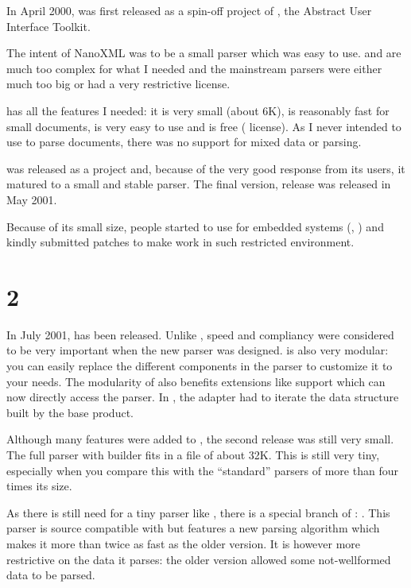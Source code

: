 In April 2000, \NanoXML{} was first released as a spin-off project of
, the Abstract User Interface Toolkit.

The intent of NanoXML was to be a small parser which was easy to use.
 and  are much too complex for what I needed and the
mainstream parsers were either much too big or had a very restrictive license.

 has all the features I needed: it is very small (about 6K),
is reasonably fast for small \XML{} documents, is very easy to use and is
free ( license).
As I never intended to use \NanoXML{} to parse  documents,
there was no support for mixed data or  parsing.

\NanoXML{} was released as a  project and, because of the
very good response from its users, it matured to a small and stable parser.
The final version, release  was released in May 2001.

Because of its small size, people started to use \NanoXML{} for embedded
systems (, ) and kindly submitted patches to make
\NanoXML{} work in such restricted environment.

\section{\NanoXML{} 2}

In July 2001,  has been released.
Unlike , speed and \XML{} compliancy were considered to be
very important when the new parser was designed.
 is also very modular: you can easily replace the different
components in the parser to customize it to your needs.
The modularity of  also benefits extensions like   support which can now directly access the parser.
In , the  adapter had to iterate the data structure built by the base product.

Although many features were added to \NanoXML{}, the second release was
still very small.
The full parser with builder fits in a  file of about 32K.
This is still very tiny, especially when you compare this with the ``standard'' parsers of more than four times its size.

As there is still need for a tiny parser like , there is a
special branch of : . This parser is source compatible with  but features a new parsing algorithm which makes it more than twice as fast as the older version.
It is however more restrictive on the \XML{} data it parses: the older
version allowed some not-wellformed data to be parsed.

